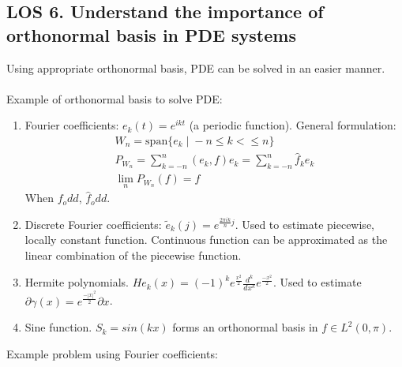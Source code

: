 \documentclass[12pt, a4paper]{article}
\begin{document}
\subsection*{LOS 6. Understand the importance of orthonormal basis in PDE systems}
Using appropriate orthonormal basis, PDE can be solved in an easier manner. \\\\
Example of orthonormal basis to solve PDE:
\begin{enumerate}
    \item Fourier coefficients: $e_k(t) = e^{ikt}$ (a periodic function). General formulation:
    \begin{gather*}
        W_n = \text{span}\{e_k\;|\;-n\leq k <\leq n\}\ \\
        P_{W_n} = \sum_{k=-n}^n (e_k, f)e_k = \sum_{k=-n}^n \hat{f}_ke_k\\
        \lim_n P_{W_n}(f) = f
    \end{gather*}
    {\tiny *When $f_odd$, $\hat{f}_odd$.}
    \item Discrete Fourier coefficients: $\tilde{e}_k(j) = e^{\frac{2\pi ik}{n}j}$. Used to estimate piecewise, locally constant function. Continuous function can be approximated as the linear combination of the piecewise function.
    \item Hermite polynomials. $He_k(x) = (-1)^ke^{\frac{x^2}{2}}\frac{d^k}{dx^k}e^{\frac{-x^2}{2}}$. Used to estimate $\partial \gamma(x) = e^{\frac{-|x|^2}{2}}\partial x$.
    \item Sine function. $S_k = sin(kx)$ forms an orthonormal basis in $f \in L^2(0, \pi)$.\\
\end{enumerate}
Example problem using Fourier coefficients:
\end{document}
